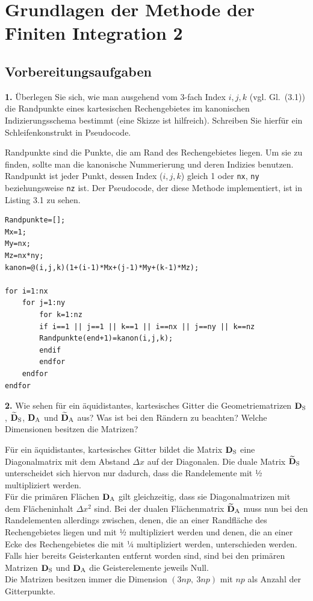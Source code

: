 \documentclass[Protokollheft.tex]{subfiles}
\begin{document}
\chapter{Grundlagen der Methode der Finiten Integration 2}

\section{Vorbereitungsaufgaben}

\begin{framed}
	\noindent \textbf{1.} Überlegen Sie sich, wie man ausgehend vom 3-fach Index $i,j,k$ (vgl. Gl.~(3.1)) die Randpunkte eines kartesischen Rechengebietes im kanonischen Indizierungsschema bestimmt (eine Skizze ist hilfreich). Schreiben Sie hierfür ein Schleifenkonstrukt in Pseudocode.\label{exer:boundIdx}
\end{framed}


Randpunkte sind die Punkte, die am Rand des Rechengebietes liegen. Um sie zu finden, sollte man die kanonische Nummerierung und deren Indizies benutzen. Randpunkt ist jeder Punkt, dessen Index ($i,j,k$) gleich 1 oder \lstinline{nx}, \lstinline{ny} beziehungsweise \lstinline{nz} ist. Der Pseudocode, der diese Methode implementiert, ist in Listing 3.1 zu sehen.
\begin{lstlisting}[caption={Pseudocode zur Ermittlung der Randpunkte },label={lst:mgn_RB}]
Randpunkte=[];
Mx=1;
My=nx;
Mz=nx*ny;
kanon=@(i,j,k)(1+(i-1)*Mx+(j-1)*My+(k-1)*Mz);

for i=1:nx
	for j=1:ny
		for k=1:nz
		if i==1 || j==1 || k==1 || i==nx || j==ny || k==nz
		Randpunkte(end+1)=kanon(i,j,k);
		endif
		endfor
	endfor
endfor
\end{lstlisting}
 

\begin{framed}
	\noindent \textbf{2.} Wie sehen für ein äquidistantes, kartesisches Gitter die Geometriematrizen $\mathbf{D}_\text{S}$, $\mathbf{\widetilde{D}}_\text{S}$, $\mathbf{D}_\text{A}$ und $\mathbf{\widetilde{D}}_\text{A}$ aus? Was ist bei den Rändern zu beachten? Welche Dimensionen besitzen die Matrizen?\label{exer:geoMatsStructure}
\end{framed}
\noindent
Für ein äquidistantes, kartesisches Gitter bildet die Matrix $\mathbf{D}_\text{S}$ eine Diagonalmatrix mit dem Abstand $\Delta x$ auf der Diagonalen. Die duale Matrix $\mathbf{\widetilde{D}}_\text{S}$ unterscheidet sich hiervon nur dadurch, dass die Randelemente mit ½ multipliziert werden. \\
Für die primären Flächen $\mathbf{D}_\text{A}$ gilt gleichzeitig, dass sie Diagonalmatrizen mit dem Flächeninhalt $\Delta x^2$ sind. Bei der dualen Flächenmatrix $\mathbf{\widetilde{D}}_\text{A}$ muss nun bei den Randelementen allerdings zwischen, denen, die an einer Randfläche des Rechengebietes liegen und mit ½ multipliziert werden und denen, die an einer Ecke des Rechengebietes die mit ¼ multipliziert werden, unterschieden werden. \\
Falls hier bereits Geisterkanten entfernt worden sind, sind bei den primären Matrizen $\mathbf{D}_\text{S}$ und $\mathbf{D}_\text{A}$ die Geisterelemente jeweils Null. \\
\noindent
Die Matrizen besitzen immer die Dimension  $(3np,\ 3np)$ mit $np$ als Anzahl der Gitterpunkte.
\end{document}
